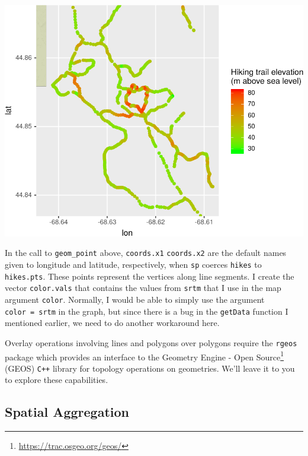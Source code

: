\documentclass[]{krantz}
\renewcommand{\href}[2]{#2\footnote{\url{#1}}}
\begin{document}
\includegraphics{bookdown_files/figure-latex/unnamed-chunk-204-1.pdf}

In the call to \texttt{geom\_point} above, \texttt{coords.x1} \texttt{coords.x2} are the default names given to longitude and latitude, respectively, when \texttt{sp} coerces \texttt{hikes} to \texttt{hikes.pts}. These points represent the vertices along line segments. I create the vector \texttt{color.vals} that contains the values from \texttt{srtm} that I use in the map argument \texttt{color}. Normally, I would be able to simply use the argument \texttt{color\ =\ srtm} in the graph, but since there is a bug in the \texttt{getData} function I mentioned earlier, we need to do another workaround here.

Overlay operations involving lines and polygons over polygons require the \texttt{rgeos} package which provides an interface to the \href{https://trac.osgeo.org/geos/}{Geometry Engine - Open Source} (GEOS) \texttt{C++} library for topology operations on geometries. We'll leave it to you to explore these capabilities.

\hypertarget{spatial-aggregation}{%
\subsection{Spatial Aggregation}\label{spatial-aggregation}}
\end{document}
